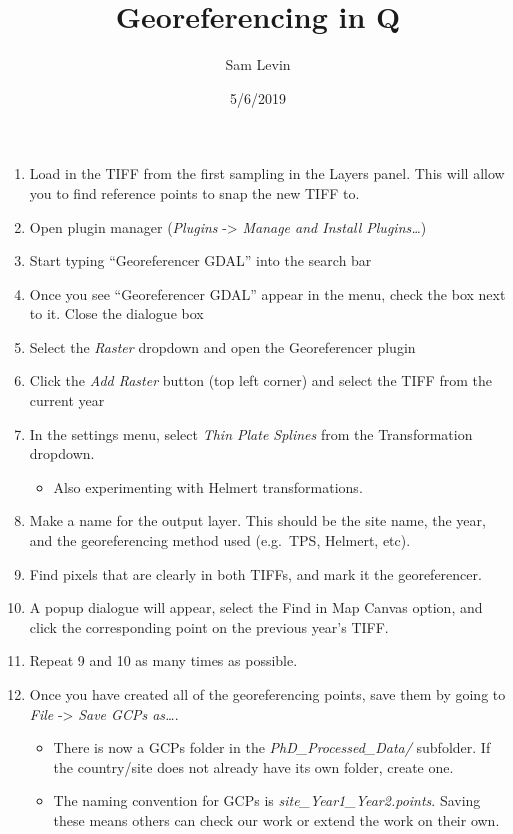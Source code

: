 \documentclass[]{article}
\title{Georeferencing in Q}
\author{Sam Levin}
\date{5/6/2019}
\providecommand{\tightlist}{%
  \setlength{\itemsep}{0pt}\setlength{\parskip}{0pt}}
\begin{document}
\maketitle

\begin{enumerate}
\def\labelenumi{\arabic{enumi}.}
\item
  Load in the TIFF from the first sampling in the Layers panel. This
  will allow you to find reference points to snap the new TIFF to.
\item
  Open plugin manager (\emph{Plugins} -\textgreater{} \emph{Manage and
  Install Plugins\ldots{}})
\item
  Start typing ``Georeferencer GDAL'' into the search bar
\item
  Once you see ``Georeferencer GDAL'' appear in the menu, check the box
  next to it. Close the dialogue box
\item
  Select the \emph{Raster} dropdown and open the Georeferencer plugin
\item
  Click the \emph{Add Raster} button (top left corner) and select the
  TIFF from the current year
\item
  In the settings menu, select \emph{Thin Plate Splines} from the
  Transformation dropdown.

  \begin{itemize}
  \tightlist
  \item
    Also experimenting with Helmert transformations.
  \end{itemize}
\item
  Make a name for the output layer. This should be the site name, the
  year, and the georeferencing method used (e.g.~TPS, Helmert, etc).
\item
  Find pixels that are clearly in both TIFFs, and mark it the
  georeferencer.
\item
  A popup dialogue will appear, select the Find in Map Canvas option,
  and click the corresponding point on the previous year's TIFF.
\item
  Repeat 9 and 10 as many times as possible.
\item
  Once you have created all of the georeferencing points, save them by
  going to \emph{File} -\textgreater{} \emph{Save GCPs as\ldots{}}.

  \begin{itemize}
  \item
    There is now a GCPs folder in the \emph{PhD\_Processed\_Data/}
    subfolder. If the country/site does not already have its own folder,
    create one.
  \item
    The naming convention for GCPs is \emph{site\_Year1\_Year2.points}.
    Saving these means others can check our work or extend the work on
    their own.
  \end{itemize}
\end{enumerate}
\end{document}
